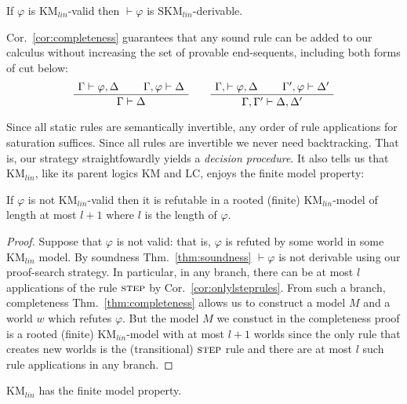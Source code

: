 \documentclass[envcountsect,envcountsame]{llncs}
\newcommand{\lcnxt}{\mathrm{KM}_{lin}}
\newcommand{\lgkm}{\mathrm{KM}}
\newcommand{\lglc}{\mathrm{LC}}
\newcommand{\seq}{\vdash}
\newcommand{\seqlcnxt}{\mathrm{SKM}_{lin}}
\newcommand{\steprulename}{\textsc{step}}
\begin{document}
\begin{corollary}[Completeness]
\label{cor:completeness}
  If 
$\varphi$ 
  is $\lcnxt$-valid then
  $\seq \varphi$
  is $\seqlcnxt$-derivable.
\end{corollary}

Cor.~\ref{cor:completeness} guarantees that any sound rule
can be added to our calculus
without increasing the set of provable end-sequents,
including both forms of cut below:
\[
  \AxiomC{$\Gamma \seq \varphi, \Delta$}
  \AxiomC{$\Gamma, \varphi \seq \Delta$}
  \BinaryInfC{$\Gamma \seq \Delta$}
  \DisplayProof 
\qquad
  \AxiomC{$\Gamma, \seq \varphi, \Delta$}
  \AxiomC{$\Gamma', \varphi \seq \Delta'$}
  \BinaryInfC{$\Gamma, \Gamma' \seq \Delta, \Delta'$}
  \DisplayProof 
\]


Since all static rules are semantically invertible, any order of rule
applications for saturation suffices. Since all rules are invertible
we never need backtracking. That is, our strategy straightfowardly yields a
\emph{decision procedure}. It also tells us that $\lcnxt$, like its parent logics $\lgkm$ and $\lglc$, enjoys the finite model property:



\begin{theorem}\label{thm-fmp}
  If $\varphi$ is not $\lcnxt$-valid then 
  it is refutable in a rooted (finite) $\lcnxt$-model
  of length at most $l+1$ where $l$ is the length of $\varphi$.
\end{theorem}
\begin{proof}
  Suppose that $\varphi$ is not valid: that is,
  $\varphi$ is refuted by some world in some $\lcnxt$ model. By
  soundness Thm.~\ref{thm:soundness} $\seq \varphi$ is
  not derivable using our proof-search strategy. In particular, in any
  branch, there can be at most $l$ applications of the rule
  $\steprulename$ by Cor.~\ref{cor:onlylsteprules}. From such a
  branch, completeness Thm.~\ref{thm:completeness} allows us to
  construct a model $M$ and a world $w$ which refutes $\varphi$. But
  the model $M$ we constuct in the completeness proof is a rooted
  (finite) $\lcnxt$-model with at most $l+1$ worlds since the only
  rule that creates new worlds is the (transitional) $\steprulename$
  rule and there are at most $l$ such rule applications in any branch.

\end{proof}

\begin{corollary}
  $ \lcnxt$ has the finite model property.
\end{corollary}
\end{document}
